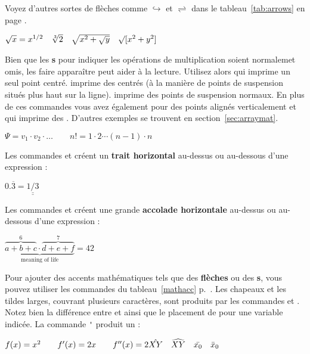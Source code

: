 Voyez d'autres sortes de flèches comme $\hookrightarrow$ et
$\rightleftharpoons$ dans le tableau~\ref{tab:arrows} en page
\pageref{tab:arrows}.
\begin{example}
$\sqrt{x} = x^{1/2}
 \quad \sqrt[3]{2}
 \quad \sqrt{x^{2} + \sqrt{y}}
 \quad \surd[x^2 + y^2]$
\end{example}


Bien que les \textbf{s} pour indiquer les opérations de
multiplication soient normalemet omis, les faire apparaître peut aider à
la lecture. Utilisez
alors  qui imprime un seul point centré.  imprime
des \textbf{} centrés (à la manière de points
de suspension situés plus haut sur la ligne).  imprime des
points de suspension normaux. En plus de ces commandes vous avez
également  pour des points alignés verticalement et
 qui imprime des . D'autres exemples
se trouvent en section~\ref{sec:arraymat}.
\begin{example}
$\Psi = v_1 \cdot v_2
 \cdot \ldots \qquad 
 n! = 1 \cdot 2 
 \cdots (n-1) \cdot n$
\end{example}

Les commandes  et  créent un \textbf{trait
horizontal} au-dessus ou au-dessous d'une expression :
\begin{example}
$0.\overline{3} = 
 \underline{\underline{1/3}}$
\end{example}

Les commandes  et  créent une grande
\textbf{accolade horizontale} au-dessus ou au-dessous d'une
expression :
\begin{example}
$\underbrace{\overbrace{a+b+c}^6 
 \cdot \overbrace{d+e+f}^7}
 _{\text{meaning of life}} = 42$
\end{example}

Pour ajouter des accents mathématiques tels que des \textbf{flèches}
ou des \textbf{s}, vous pouvez utiliser les commandes du
tableau~\ref{mathacc} p.~\pageref{mathacc}.  Les chapeaux et les
tildes larges, couvrant plusieurs caractères, sont produits par les
commandes  et . Notez bien la différence
entre  et  ainsi que le placement de  pour
une variable indicée. La commande \verb|'| produit
un  :
\begin{example}
$f(x) = x^2 \qquad f'(x) 
 = 2x \qquad f''(x) = 2\\[5pt]
 \hat{XY} \quad \widehat{XY}
 \quad \bar{x_0} \quad \bar{x}_0$
\end{example}


